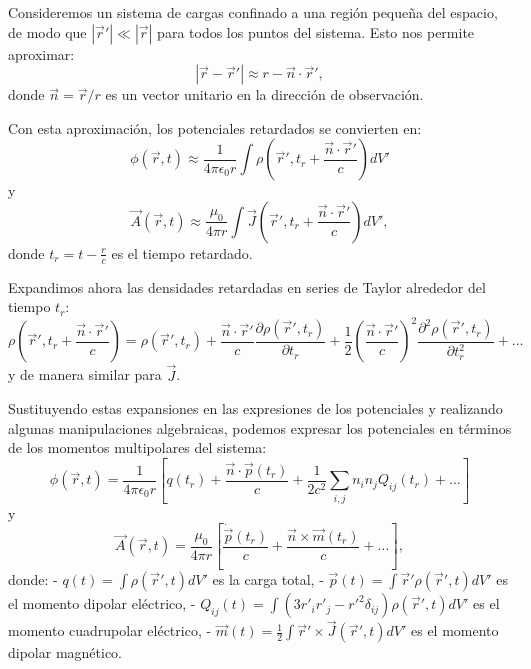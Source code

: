 \documentclass[12pt,a4paper]{book}
\begin{document}
Consideremos un sistema de cargas confinado a una región pequeña del espacio, de modo que $|\vec{r}'| \ll |\vec{r}|$ para todos los puntos del sistema. Esto nos permite aproximar:
\begin{equation}
|\vec{r}-\vec{r}'| \approx r - \vec{n} \cdot \vec{r}',
\end{equation}
donde $\vec{n} = \vec{r}/r$ es un vector unitario en la dirección de observación.

Con esta aproximación, los potenciales retardados se convierten en:
\begin{equation}
\phi(\vec{r}, t) \approx \frac{1}{4\pi\epsilon_0r}\int\rho(\vec{r}', t_r + \frac{\vec{n} \cdot \vec{r}'}{c})dV'
\end{equation}
y
\begin{equation}
\vec{A}(\vec{r}, t) \approx \frac{\mu_0}{4\pi r}\int\vec{J}(\vec{r}', t_r + \frac{\vec{n} \cdot \vec{r}'}{c})dV',
\end{equation}
donde $t_r = t - \frac{r}{c}$ es el tiempo retardado.

Expandimos ahora las densidades retardadas en series de Taylor alrededor del tiempo $t_r$:
\begin{equation}
\rho(\vec{r}', t_r + \frac{\vec{n} \cdot \vec{r}'}{c}) = \rho(\vec{r}', t_r) + \frac{\vec{n} \cdot \vec{r}'}{c}\frac{\partial\rho(\vec{r}', t_r)}{\partial t_r} + \frac{1}{2}\left(\frac{\vec{n} \cdot \vec{r}'}{c}\right)^2\frac{\partial^2\rho(\vec{r}', t_r)}{\partial t_r^2} + \ldots
\end{equation}
y de manera similar para $\vec{J}$.

Sustituyendo estas expansiones en las expresiones de los potenciales y realizando algunas manipulaciones algebraicas, podemos expresar los potenciales en términos de los momentos multipolares del sistema:
\begin{equation}
\phi(\vec{r}, t) = \frac{1}{4\pi\epsilon_0r}\left[q(t_r) + \frac{\vec{n} \cdot \vec{p}(t_r)}{c} + \frac{1}{2c^2}\sum_{i,j}n_in_jQ_{ij}(t_r) + \ldots\right]
\end{equation}
y
\begin{equation}
\vec{A}(\vec{r}, t) = \frac{\mu_0}{4\pi r}\left[\frac{\dot{\vec{p}}(t_r)}{c} + \frac{\vec{n} \times \vec{m}(t_r)}{c} + \ldots\right],
\end{equation}
donde:
- $q(t) = \int\rho(\vec{r}', t)dV'$ es la carga total,
- $\vec{p}(t) = \int\vec{r}'\rho(\vec{r}', t)dV'$ es el momento dipolar eléctrico,
- $Q_{ij}(t) = \int(3r'_ir'_j - r'^2\delta_{ij})\rho(\vec{r}', t)dV'$ es el momento cuadrupolar eléctrico,
- $\vec{m}(t) = \frac{1}{2}\int\vec{r}' \times \vec{J}(\vec{r}', t)dV'$ es el momento dipolar magnético.
\end{document}
